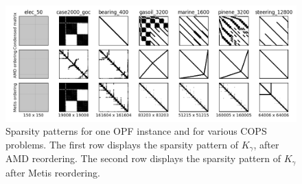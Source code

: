 \begin{figure}[!ht]
  \centering
  \includegraphics[width=.9\textwidth]{figures/sparsity_pattern.png}
  \caption{Sparsity patterns for one OPF instance and for various
    COPS problems. The first row displays the sparsity pattern
    of $K_\gamma$, after AMD reordering. The second row displays
    the sparsity pattern of $K_\gamma$ after Metis reordering.
    \label{fig:cops:nnz}
  }
\end{figure}


